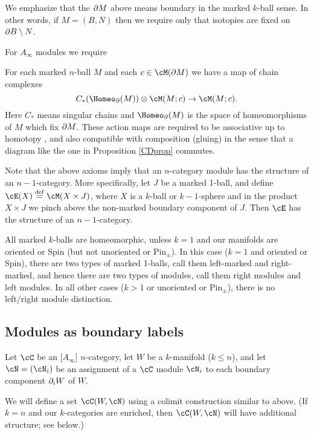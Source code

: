 
We emphasize that the $\partial M$ above means boundary in the marked $k$-ball sense.
In other words, if $M = (B, N)$ then we require only that isotopies are fixed 
on $\partial B \setminus N$.

For $A_\infty$ modules we require

{For each marked $n$-ball $M$ and each $c\in \cM(\bd M)$ we have a map of chain complexes
\[
	C_*(\Homeo_\bd(M))\ot \cM(M; c) \to \cM(M; c) .
\]
Here $C_*$ means singular chains and $\Homeo_\bd(M)$ is the space of homeomorphisms of $M$
which fix $\partial M$.
These action maps are required to be associative up to homotopy
, and also compatible with composition (gluing) in the sense that
a diagram like the one in Proposition \ref{CDprop} commutes.
}

\medskip

Note that the above axioms imply that an $n$-category module has the structure
of an $n{-}1$-category.
More specifically, let $J$ be a marked 1-ball, and define $\cE(X)\deq \cM(X\times J)$,
where $X$ is a $k$-ball or $k{-}1$-sphere and in the product $X\times J$ we pinch 
above the non-marked boundary component of $J$.
Then $\cE$ has the structure of an $n{-}1$-category.

All marked $k$-balls are homeomorphic, unless $k = 1$ and our manifolds
are oriented or Spin (but not unoriented or $\text{Pin}_\pm$).
In this case ($k=1$ and oriented or Spin), there are two types
of marked 1-balls, call them left-marked and right-marked,
and hence there are two types of modules, call them right modules and left modules.
In all other cases ($k>1$ or unoriented or $\text{Pin}_\pm$),
there is no left/right module distinction.


\subsection{Modules as boundary labels}
\label{moddecss}

Let $\cC$ be an [$A_\infty$] $n$-category, let $W$ be a $k$-manifold ($k\le n$),
and let $\cN = (\cN_i)$ be an assignment of a $\cC$ module $\cN_i$ to each boundary 
component $\partial_i W$ of $W$.

We will define a set $\cC(W, \cN)$ using a colimit construction similar to above.
(If $k = n$ and our $k$-categories are enriched, then
$\cC(W, \cN)$ will have additional structure; see below.)

